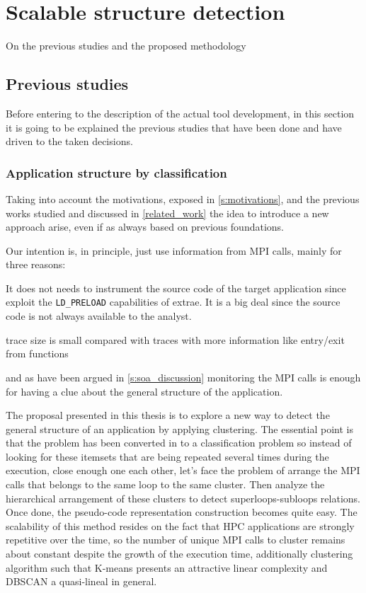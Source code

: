 
\chapter{Scalable structure detection}

On the previous studies and the proposed methodology

\section{Previous studies}

Before entering to the description of the actual tool development, in this 
section it is going to be explained the previous studies that have been done and
have driven to the taken decisions.

\subsection{Application structure by classification}

Taking into account the motivations, exposed in \ref{s:motivations}, and the
previous works studied and discussed in \ref{related_work} the idea to introduce
a new approach arise, even if as always based on previous foundations.  
 
Our intention is, in principle, just use information from MPI calls, mainly for 
three reasons:
\begin{enumerate*}[label=\roman*)]
  \item It does not needs to instrument the source code of the target
    application since exploit the \texttt{LD\_PRELOAD} capabilities of extrae.
    It is a big deal since the source code is not always available to the
    analyst.
  \item trace size is small compared with traces with more information
    like entry/exit from functions
  \item and as have been argued in \ref{s:soa_discussion} monitoring the MPI 
    calls is enough for having a clue about the general structure of the 
    application.
\end{enumerate*}

The proposal presented in this thesis is to explore a new way to detect the
 general structure of an application by applying clustering. 
The essential point is that the problem has been converted in to a classification 
problem so instead of looking for these itemsets that are being
repeated several times during the execution, close enough one each other, let's
face the problem of arrange the MPI calls that belongs to the same loop to the
same cluster. Then analyze the hierarchical arrangement of these clusters to
detect superloops-subloops relations. Once done, the pseudo-code representation 
construction becomes quite easy. The scalability of this method resides on the 
fact that
HPC applications are strongly repetitive over the time, so the number of unique
MPI calls to cluster remains about constant despite the growth of the execution
time, additionally clustering algorithm such that K-means presents an attractive 
linear complexity and DBSCAN a quasi-lineal in general.

